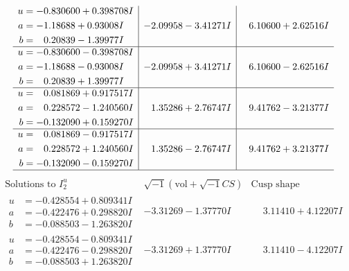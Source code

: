 \documentclass[1p]{elsarticle_modified}
\theoremstyle{definition}
\newcommand{\I}{\sqrt{-1}}
\begin{document}
$$\begin{array}{c|c|c}
\begin{aligned}
u &= -0.830600 + 0.398708 I \\
a &= -1.18688 + 0.93008 I \\
b &= \phantom{-}0.20839 - 1.39977 I\end{aligned}
 & -2.09958 - 3.41271 I & \phantom{-}6.10600 + 2.62516 I \\ \hline\begin{aligned}
u &= -0.830600 - 0.398708 I \\
a &= -1.18688 - 0.93008 I \\
b &= \phantom{-}0.20839 + 1.39977 I\end{aligned}
 & -2.09958 + 3.41271 I & \phantom{-}6.10600 - 2.62516 I \\ \hline\begin{aligned}
u &= \phantom{-}0.081869 + 0.917517 I \\
a &= \phantom{-}0.228572 - 1.240560 I \\
b &= -0.132090 + 0.159270 I\end{aligned}
 & \phantom{-}1.35286 + 2.76747 I & \phantom{-}9.41762 - 3.21377 I \\ \hline\begin{aligned}
u &= \phantom{-}0.081869 - 0.917517 I \\
a &= \phantom{-}0.228572 + 1.240560 I \\
b &= -0.132090 - 0.159270 I\end{aligned}
 & \phantom{-}1.35286 - 2.76747 I & \phantom{-}9.41762 + 3.21377 I\\
 \hline 
 \end{array}$$\newpage$$\begin{array}{c|c|c}  
\text{Solutions to }I^u_{2}& \I (\text{vol} + \sqrt{-1}CS) & \text{Cusp shape}\\
 \hline 
\begin{aligned}
u &= -0.428554 + 0.809341 I \\
a &= -0.422476 + 0.298820 I \\
b &= -0.088503 - 1.263820 I\end{aligned}
 & -3.31269 - 1.37770 I & \phantom{-}3.11410 + 4.12207 I \\ \hline\begin{aligned}
u &= -0.428554 - 0.809341 I \\
a &= -0.422476 - 0.298820 I \\
b &= -0.088503 + 1.263820 I\end{aligned}
 & -3.31269 + 1.37770 I & \phantom{-}3.11410 - 4.12207 I \\ \hline\begin{aligned}

\end{aligned}
\end{array}$$
\end{document}
